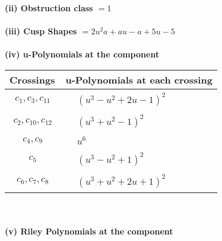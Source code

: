 \documentclass[1p]{elsarticle_modified}
\theoremstyle{definition}
\begin{document}
\flushleft \textbf{(ii) Obstruction class $= 1$}\\~\\
\flushleft \textbf{(iii) Cusp Shapes $= 2 u^2 a+a u- a+5 u-5$}\\~\\
\newpage\renewcommand{\arraystretch}{1}
\flushleft \textbf{(iv) u-Polynomials at the component}\newline \\
\begin{tabular}{m{50pt}|m{274pt}}
Crossings & \hspace{64pt}u-Polynomials at each crossing \\
\hline $$\begin{aligned}c_{1},c_{3},c_{11}\end{aligned}$$&$\begin{aligned}
&(u^3- u^2+2 u-1)^2
\end{aligned}$\\
\hline $$\begin{aligned}c_{2},c_{10},c_{12}\end{aligned}$$&$\begin{aligned}
&(u^3+u^2-1)^2
\end{aligned}$\\
\hline $$\begin{aligned}c_{4},c_{9}\end{aligned}$$&$\begin{aligned}
&u^6
\end{aligned}$\\
\hline $$\begin{aligned}c_{5}\end{aligned}$$&$\begin{aligned}
&(u^3- u^2+1)^2
\end{aligned}$\\
\hline $$\begin{aligned}c_{6},c_{7},c_{8}\end{aligned}$$&$\begin{aligned}
&(u^3+u^2+2 u+1)^2
\end{aligned}$\\
\hline
\end{tabular}\\~\\
\newpage\renewcommand{\arraystretch}{1}
\flushleft \textbf{(v) Riley Polynomials at the component}\newline \\
\end{document}
